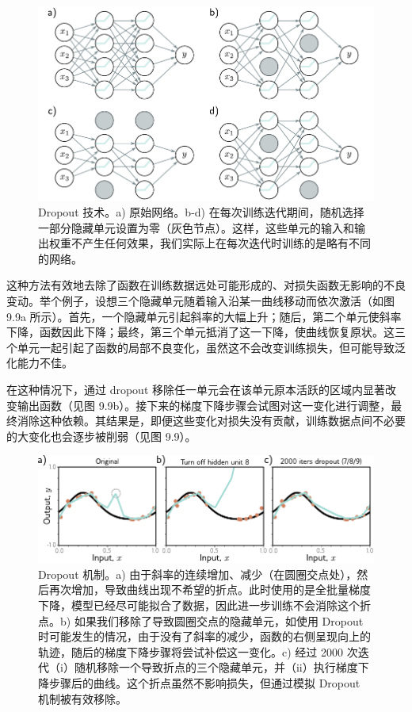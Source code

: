 \documentclass[lang=cn,newtx,10pt,scheme=chinese]{elegantbook}
\begin{document}
\begin{figure}[ht!]
	\centering
	\includegraphics[width=0.7\linewidth]{PDFFigures/UDLChap9PDF/RegDropoutNetwork.pdf}
	\caption{Dropout 技术。a) 原始网络。b-d) 在每次训练迭代期间，随机选择一部分隐藏单元设置为零（灰色节点）。这样，这些单元的输入和输出权重不产生任何效果，我们实际上在每次迭代时训练的是略有不同的网络。}
\end{figure}


这种方法有效地去除了函数在训练数据远处可能形成的、对损失函数无影响的不良变动。举个例子，设想三个隐藏单元随着输入沿某一曲线移动而依次激活（如图 9.9a 所示）。首先，一个隐藏单元引起斜率的大幅上升；随后，第二个单元使斜率下降，函数因此下降；最终，第三个单元抵消了这一下降，使曲线恢复原状。这三个单元一起引起了函数的局部不良变化，虽然这不会改变训练损失，但可能导致泛化能力不佳。

在这种情况下，通过 dropout 移除任一单元会在该单元原本活跃的区域内显著改变输出函数（见图 9.9b）。接下来的梯度下降步骤会试图对这一变化进行调整，最终消除这种依赖。其结果是，即便这些变化对损失没有贡献，训练数据点间不必要的大变化也会逐步被削弱（见图 9.9）。

\begin{figure}[ht!]
	\centering
	\includegraphics[width=0.7\linewidth]{PDFFigures/UDLChap9PDF/RegDropout.pdf}
	\caption{Dropout 机制。a) 由于斜率的连续增加、减少（在圆圈交点处），然后再次增加，导致曲线出现不希望的折点。此时使用的是全批量梯度下降，模型已经尽可能拟合了数据，因此进一步训练不会消除这个折点。b) 如果我们移除了导致圆圈交点的隐藏单元，如使用 Dropout 时可能发生的情况，由于没有了斜率的减少，函数的右侧呈现向上的轨迹，随后的梯度下降步骤将尝试补偿这一变化。c) 经过 2000 次迭代（i）随机移除一个导致折点的三个隐藏单元，并（ii）执行梯度下降步骤后的曲线。这个折点虽然不影响损失，但通过模拟 Dropout 机制被有效移除。}
\end{figure}
\end{document}
